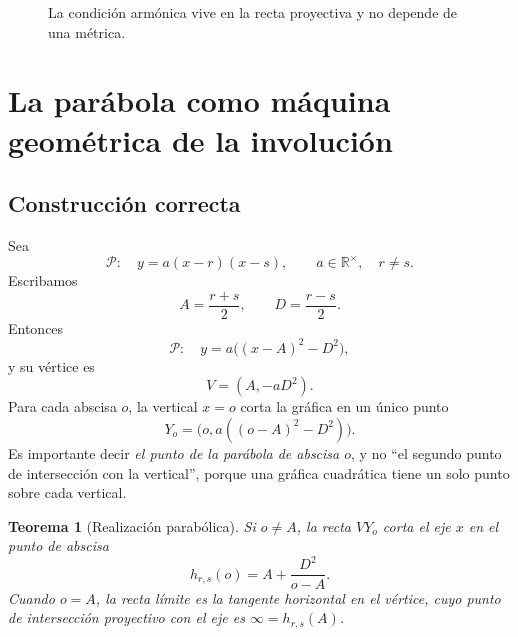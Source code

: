 \documentclass[11pt,oneside]{scrartcl}
\theoremstyle{plainblue}
\newtheorem{theorem}{Teorema}[section]
\theoremstyle{definitionblue}
\theoremstyle{remarkgray}
\newcommand{\RR}{\mathbb{R}}
\newcommand{\PP}{\mathbb{P}}
\begin{document}
\begin{figure}[ht]
\centering
{}
\caption{La condición armónica vive en la recta proyectiva y no depende de una métrica.}
\label{fig:harmonic-line}
\end{figure}

\section{La parábola como máquina geométrica de la involución}

\subsection{Construcción correcta}

Sea
\[
\mathcal P:\quad y=a(x-r)(x-s),\qquad a\in\RR^\times,\quad r\ne s.
\]
Escribamos
\[
A=\frac{r+s}{2},\qquad D=\frac{r-s}{2}.
\]
Entonces
\[
\mathcal P:\quad y=a\bigl((x-A)^2-D^2\bigr),
\]
y su vértice es
\[
V=(A,-aD^2).
\]
Para cada abscisa \(o\), la vertical \(x=o\) corta la gráfica en un único punto
\[
Y_o=\bigl(o,a((o-A)^2-D^2)\bigr).
\]
Es importante decir \emph{el punto de la parábola de abscisa \(o\)}, y no ``el
segundo punto de intersección con la vertical'', porque una gráfica cuadrática tiene
un solo punto sobre cada vertical.

\begin{theorem}[Realización parabólica]\label{thm:parabola-harmonic}
Si \(o\ne A\), la recta \(VY_o\) corta el eje \(x\) en el punto de abscisa
\[
h_{r,s}(o)=A+\frac{D^2}{o-A}.
\]
Cuando \(o=A\), la recta límite es la tangente horizontal en el vértice, cuyo punto
de intersección proyectivo con el eje es \(\infty=h_{r,s}(A)\).
\end{theorem}
\end{document}
